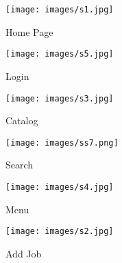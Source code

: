 
\begin{figure}[h]
\centering \texttt{[image: images/s1.jpg]}
\caption{Home Page}
\end{figure}
\newpage

\begin{figure}[h]
\centering \texttt{[image: images/s5.jpg]}
\caption{Login}
\end{figure}
\newpage
\begin{figure}[h]
\centering \texttt{[image: images/s3.jpg]}
\caption{Catalog}
\end{figure}
\newpage
\begin{figure}[h]
\centering \texttt{[image: images/ss7.png]}
\caption{Search}
\end{figure}
\newpage
\begin{figure}[h]
\centering \texttt{[image: images/s4.jpg]}
\caption{Menu}
\end{figure}
\newpage
\begin{figure}[h]
\centering \texttt{[image: images/s2.jpg]}
\caption{Add Job}
\end{figure}
\newpage








